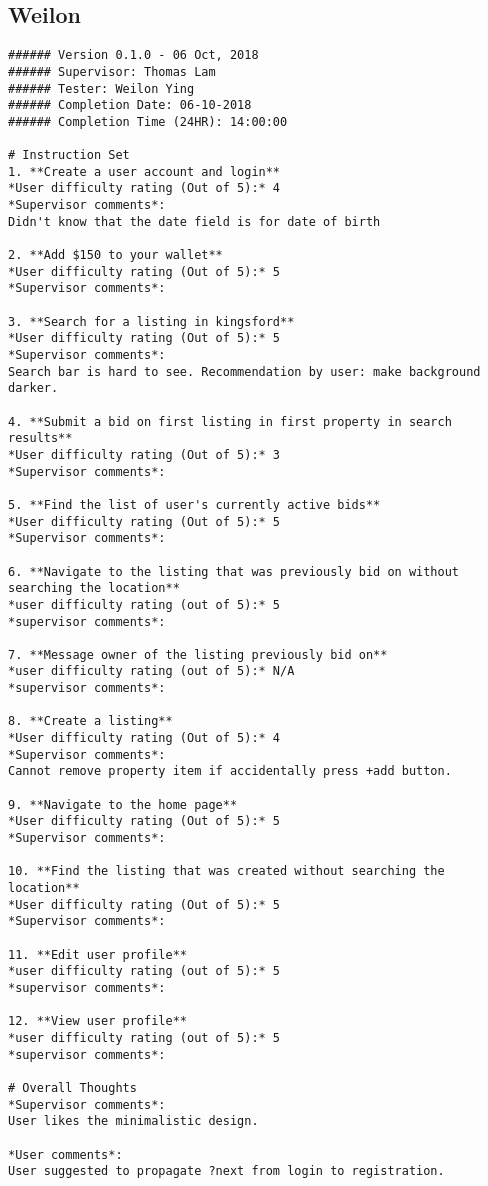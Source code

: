\subsection{Weilon}
\begin{lstlisting}
###### Version 0.1.0 - 06 Oct, 2018
###### Supervisor: Thomas Lam
###### Tester: Weilon Ying
###### Completion Date: 06-10-2018
###### Completion Time (24HR): 14:00:00

# Instruction Set
1. **Create a user account and login**
*User difficulty rating (Out of 5):* 4
*Supervisor comments*:
Didn't know that the date field is for date of birth

2. **Add $150 to your wallet**
*User difficulty rating (Out of 5):* 5
*Supervisor comments*:

3. **Search for a listing in kingsford**
*User difficulty rating (Out of 5):* 5
*Supervisor comments*:
Search bar is hard to see. Recommendation by user: make background darker.

4. **Submit a bid on first listing in first property in search results**
*User difficulty rating (Out of 5):* 3
*Supervisor comments*:

5. **Find the list of user's currently active bids**
*User difficulty rating (Out of 5):* 5
*Supervisor comments*:

6. **Navigate to the listing that was previously bid on without searching the location**
*user difficulty rating (out of 5):* 5
*supervisor comments*:

7. **Message owner of the listing previously bid on**
*user difficulty rating (out of 5):* N/A
*supervisor comments*:

8. **Create a listing**
*User difficulty rating (Out of 5):* 4
*Supervisor comments*:
Cannot remove property item if accidentally press +add button.

9. **Navigate to the home page**
*User difficulty rating (Out of 5):* 5
*Supervisor comments*:

10. **Find the listing that was created without searching the location**
*User difficulty rating (Out of 5):* 5
*Supervisor comments*:

11. **Edit user profile**
*user difficulty rating (out of 5):* 5
*supervisor comments*:

12. **View user profile**
*user difficulty rating (out of 5):* 5
*supervisor comments*:

# Overall Thoughts
*Supervisor comments*:
User likes the minimalistic design.

*User comments*:
User suggested to propagate ?next from login to registration.

\end{lstlisting}
